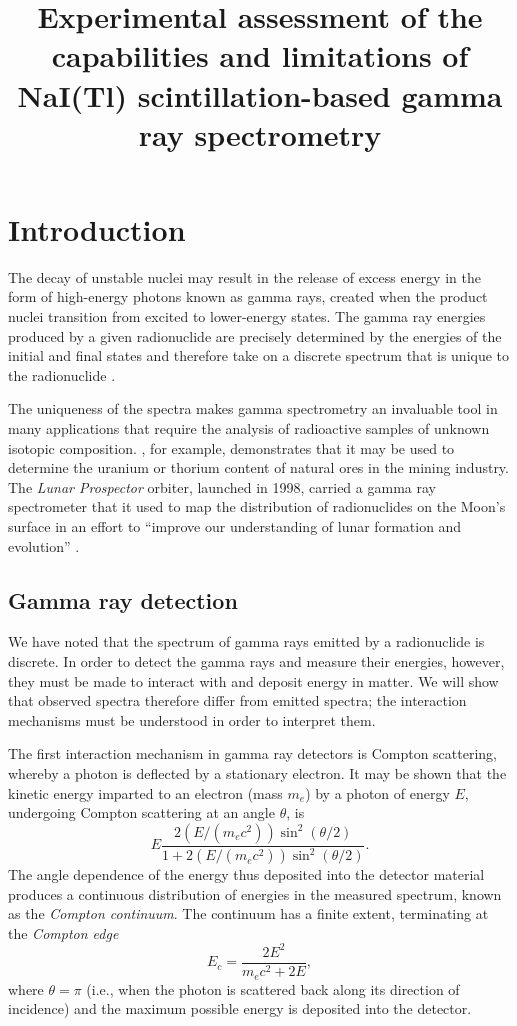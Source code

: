 \documentclass[twocol]{ametsocV6.1}
\title{
	Experimental assessment of the capabilities and limitations of
	NaI(Tl) scintillation-based gamma ray spectrometry
}
\affiliation{\aff{a}{
	School of Physics, University of New South Wales,
	Sydney, Australia
}}
\begin{document}
\maketitle

\section{Introduction}\label{sec:intro}
The decay of unstable nuclei may result in the release of excess energy
in the form of high-energy photons known as gamma rays, created when the
product nuclei transition from excited to lower-energy states. The gamma ray
energies produced by a given radionuclide are precisely determined by
the energies of the initial and final states and therefore take on a discrete
spectrum that is unique to the radionuclide \citep[p. 191]{lannunziata_2006}.

The uniqueness of the spectra makes gamma spectrometry an invaluable tool
in many applications that require the analysis of radioactive samples of
unknown isotopic composition. \cite{mero_1960}, for example, demonstrates
that it may be used to determine the uranium or thorium content of natural
ores in the mining industry. The \emph{Lunar Prospector} orbiter,
launched in 1998, carried a gamma ray spectrometer that it used to map the
distribution of radionuclides on the Moon's surface in an effort to
``improve our understanding of lunar formation and evolution''
\citep{lawrence_et_al_1998}.

\subsection{Gamma ray detection}
We have noted that the spectrum of gamma rays emitted by a radionuclide is
discrete.
In order to detect the gamma rays and measure their energies, however,
they must be made to interact with and deposit energy in matter.
We will show that observed spectra therefore differ from emitted spectra; the
interaction mechanisms must be understood in order to interpret them.

The first interaction mechanism in gamma ray detectors is Compton scattering,
whereby a photon is deflected by a stationary electron.
It may be shown that the kinetic energy imparted to an electron
(mass $m_e$) by a photon
of energy $E$, undergoing Compton scattering at an angle $\theta$, is
\[\displaystyle
    E \frac{
        2 \left(E/\left(m_e c^2\right)\right) \sin^2 (\theta/2)
    }{
        1 + 2 \left(E/\left(m_e c^2\right)\right) \sin^2 (\theta/2)
    }.
\]
The angle dependence of the energy thus deposited into the detector material
produces a continuous distribution of energies in the measured spectrum,
known as the \emph{Compton continuum}.
The continuum has a finite extent, terminating at the \emph{Compton edge}
\begin{equation}
	E_c = \frac{2E^2}{m_e c^2 + 2E},
	\label{eqn:compton_edge}
\end{equation}
where $\theta = \pi$ (i.e., when the photon is scattered back along its
direction of incidence)
and the maximum possible energy is deposited into the
detector.
\end{document}
